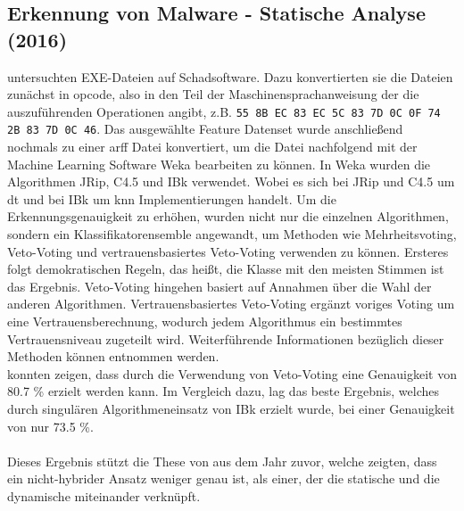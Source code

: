 \documentclass[
    12pt, %
    DIV10,
    ngerman, %
    a4paper, %
    oneside, %
    titlepage, %
    parskip=half, %
    headings=normal, %
    listof=totoc, %
    bibliography=totoc, %
    index=totoc, %
    captions=tableheading, %
    final %
]{scrreprt}
\begin{document}
\subsection{Erkennung von Malware - Statische Analyse (2016)}
\textcite{More2016} untersuchten EXE-Dateien auf Schadsoftware. Dazu konvertierten sie die Dateien zunächst in \ac{opcode}, also in den Teil der Maschinensprachanweisung der die auszuführenden Operationen angibt, z.B. \texttt{55 8B EC 83 EC 5C 83 7D 0C 0F 74 2B 83 7D 0C 46}. Das ausgewählte Feature Datenset wurde anschließend nochmals zu einer \ac{arff} Datei konvertiert, um die Datei nachfolgend mit der Machine Learning Software Weka bearbeiten zu können. 
In Weka wurden die Algorithmen JRip, C4.5 und IBk verwendet. Wobei es sich bei JRip und C4.5 um \ac{dt} und bei IBk um \ac{knn} Implementierungen handelt. Um die Erkennungsgenauigkeit zu erhöhen, wurden nicht nur die einzelnen Algorithmen, sondern ein Klassifikatorensemble angewandt, um Methoden wie Mehrheitsvoting, Veto-Voting und vertrauensbasiertes Veto-Voting verwenden zu können. Ersteres folgt demokratischen Regeln, das heißt, die Klasse mit den meisten Stimmen ist das Ergebnis. Veto-Voting hingehen basiert auf Annahmen über die Wahl der anderen Algorithmen. Vertrauensbasiertes Veto-Voting ergänzt voriges Voting um eine Vertrauensberechnung, wodurch jedem Algorithmus ein bestimmtes Vertrauensniveau zugeteilt wird. Weiterführende Informationen bezüglich dieser Methoden können \textcite{shahzad2013comparative} entnommen werden. \\
\textcite{More2016} konnten zeigen, dass durch die Verwendung von Veto-Voting eine Genauigkeit von 80.7 \% erzielt werden kann. Im Vergleich dazu, lag das beste Ergebnis, welches durch singulären Algorithmeneinsatz von IBk erzielt wurde, bei einer Genauigkeit von nur 73.5 \%.\\\\
Dieses Ergebnis stützt die These von \textcite{Shijo2015} aus dem Jahr zuvor, welche zeigten, dass ein nicht-hybrider Ansatz weniger genau ist, als einer, der die statische und die dynamische miteinander verknüpft.
\end{document}
